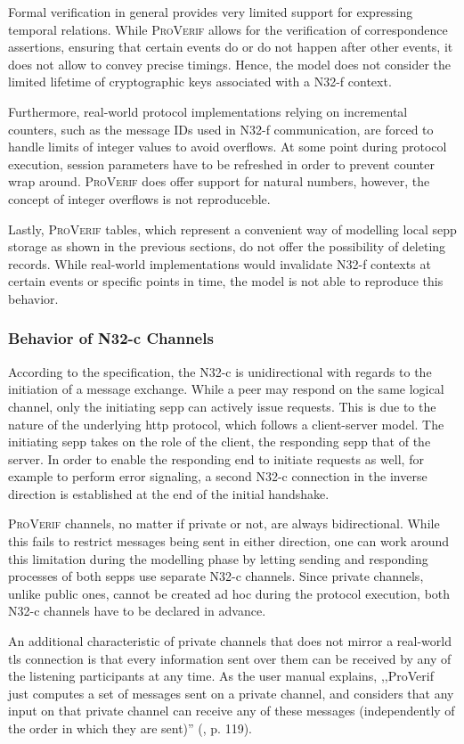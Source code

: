 Formal verification in general provides very limited support for expressing temporal relations.
While \textsc{ProVerif} allows for the verification of correspondence assertions, ensuring that certain events do or do not happen after other events, it does not allow to convey precise timings.
Hence, the model does not consider the limited lifetime of cryptographic keys associated with a N32-f context.

Furthermore, real-world protocol implementations relying on incremental counters, such as the message IDs used in N32-f communication, are forced to handle limits of integer values to avoid overflows.
At some point during protocol execution, session parameters have to be refreshed in order to prevent counter wrap around.
\textsc{ProVerif} does offer support for natural numbers, however, the concept of integer overflows is not reproduceble.

Lastly, \textsc{ProVerif} tables, which represent a convenient way of modelling local \gls{sepp} storage as shown in the previous sections, do not offer the possibility of deleting records.
While real-world implementations would invalidate N32-f contexts at certain events or specific points in time, the model is not able to reproduce this behavior.

\subsubsection{Behavior of N32-c Channels}

According to the specification, the N32-c is unidirectional with regards to the initiation of a message exchange.
While a peer may respond on the same logical channel, only the initiating \gls{sepp} can actively issue requests.
This is due to the nature of the underlying \gls{http} protocol, which follows a client-server model.
The initiating \gls{sepp} takes on the role of the client, the responding \gls{sepp} that of the server.
In order to enable the responding end to initiate requests as well, for example to perform error signaling, a second N32-c connection in the inverse direction is established at the end of the initial handshake.

\textsc{ProVerif} channels, no matter if private or not, are always bidirectional.
While this fails to restrict messages being sent in either direction, one can work around this limitation during the modelling phase by letting sending and responding processes of both \glspl{sepp} use separate N32-c channels.
Since private channels, unlike public ones, cannot be created ad hoc during the protocol execution, both N32-c channels have to be declared in advance.

An additional characteristic of private channels that does not mirror a real-world \gls{tls} connection is that every information sent over them can be received by any of the listening participants at any time.
As the user manual explains, ,,ProVerif just computes a set of messages sent on a private channel, and considers that any input on that private channel can receive any of these messages (independently of the order in which
they are sent)'' (\cite{blanchet2020proverif}, p. 119).